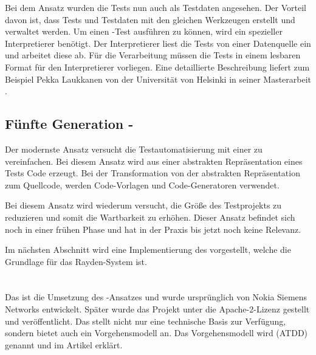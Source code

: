 \SuperPar
Bei dem Ansatz  wurden die Tests nun auch als Testdaten angesehen. Der Vorteil davon ist, dass Tests und Testdaten mit den gleichen Werkzeugen erstellt und verwaltet werden. Um einen -Test ausführen zu können, wird ein spezieller Interpretierer benötigt. Der Interpretierer liest die Tests von einer Datenquelle ein und arbeitet diese ab. Für die Verarbeitung müssen die Tests in einem lesbaren Format für den Interpretierer vorliegen. Eine detaillierte Beschreibung liefert zum Beispiel Pekka Laukkanen von der Universität von Helsinki in seiner Masterarbeit \cite{Lauk06}. 

\subsection{Fünfte Generation - }

Der modernste Ansatz versucht die Testautomatisierung mit einer  zu vereinfachen. Bei diesem Ansatz wird aus einer abstrakten Repräsentation eines Tests Code erzeugt. Bei der Transformation von der abstrakten Repräsentation zum Quellcode, werden Code-Vorlagen und Code-Generatoren verwendet.

\SuperPar
Bei diesem Ansatz wird wiederum versucht, die Größe des Testprojekts zu reduzieren und somit die Wartbarkeit zu erhöhen. Dieser Ansatz befindet sich noch in einer frühen Phase und hat in der Praxis bis jetzt noch keine Relevanz. 

\SuperPar
Im nächsten Abschnitt wird eine Implementierung des  vorgestellt, welche die Grundlage für das Rayden-System ist.

\section{}

Das  \cite{Robot} ist die Umsetzung des -Ansatzes und wurde ursprünglich von Nokia Siemens Networks entwickelt. Später wurde das Projekt unter die Apache-2-Lizenz gestellt und veröffentlicht. Das  stellt nicht nur eine technische Basis zur Verfügung, sondern bietet auch ein Vorgehensmodell an. Das Vorgehensmodell wird  (ATDD) genannt und im Artikel  \cite{Lar10} erklärt.

